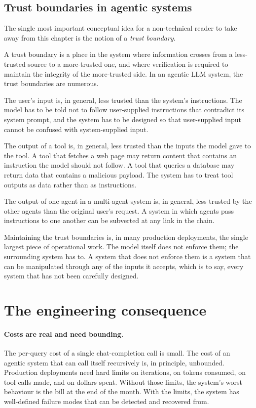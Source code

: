 \subsection*{Trust boundaries in agentic systems}

The single most important conceptual idea for a non-technical
reader to take away from this chapter is the notion of a
\emph{trust boundary}.

A trust boundary is a place in the system where information
crosses from a less-trusted source to a more-trusted one, and
where verification is required to maintain the integrity of
the more-trusted side. In an agentic LLM system, the trust
boundaries are numerous.

The user's input is, in general, less trusted than the
system's instructions. The model has to be told not to follow
user-supplied instructions that contradict its system prompt,
and the system has to be designed so that user-supplied input
cannot be confused with system-supplied input.

The output of a tool is, in general, less trusted than the
inputs the model gave to the tool. A tool that fetches a web
page may return content that contains an instruction the
model should not follow. A tool that queries a database may
return data that contains a malicious payload. The system has
to treat tool outputs as data rather than as instructions.

The output of one agent in a multi-agent system is, in
general, less trusted by the other agents than the original
user's request. A system in which agents pass instructions to
one another can be subverted at any link in the chain.

Maintaining the trust boundaries is, in many production
deployments, the single largest piece of operational work.
The model itself does not enforce them; the surrounding
system has to. A system that does not enforce them is a
system that can be manipulated through any of the inputs it
accepts, which is to say, every system that has not been
carefully designed.

\section{The engineering consequence}

\paragraph{Costs are real and need bounding.} The per-query
cost of a single chat-completion call is small. The cost of
an agentic system that can call itself recursively is, in
principle, unbounded. Production deployments need hard limits
on iterations, on tokens consumed, on tool calls made, and on
dollars spent. Without those limits, the system's worst
behaviour is the bill at the end of the month. With the
limits, the system has well-defined failure modes that can be
detected and recovered from.


